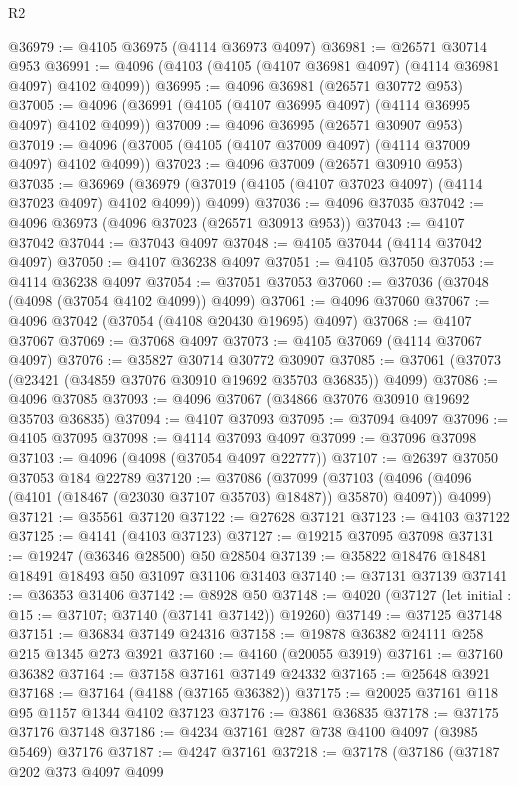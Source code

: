 \begin{lexlean}{R2}
\begin{coremodule}
@36979 := @4105 @36975 (@4114 @36973 @4097)
@36981 := @26571 @30714 @953
@36991 := @4096 (@4103 (@4105 (@4107 @36981 @4097) (@4114 @36981 @4097) @4102 @4099))
@36995 := @4096 @36981 (@26571 @30772 @953)
@37005 := @4096 (@36991 (@4105 (@4107 @36995 @4097) (@4114 @36995 @4097) @4102 @4099))
@37009 := @4096 @36995 (@26571 @30907 @953)
@37019 := @4096 (@37005 (@4105 (@4107 @37009 @4097) (@4114 @37009 @4097) @4102 @4099))
@37023 := @4096 @37009 (@26571 @30910 @953)
@37035 := @36969
    (@36979 (@37019 (@4105 (@4107 @37023 @4097) (@4114 @37023 @4097) @4102 @4099)) @4099)
@37036 := @4096 @37035
@37042 := @4096 @36973 (@4096 @37023 (@26571 @30913 @953))
@37043 := @4107 @37042
@37044 := @37043 @4097
@37048 := @4105 @37044 (@4114 @37042 @4097)
@37050 := @4107 @36238 @4097
@37051 := @4105 @37050
@37053 := @4114 @36238 @4097
@37054 := @37051 @37053
@37060 := @37036 (@37048 (@4098 (@37054 @4102 @4099)) @4099)
@37061 := @4096 @37060
@37067 := @4096 @37042 (@37054 (@4108 @20430 @19695) @4097)
@37068 := @4107 @37067
@37069 := @37068 @4097
@37073 := @4105 @37069 (@4114 @37067 @4097)
@37076 := @35827 @30714 @30772 @30907
@37085 := @37061 (@37073 (@23421 (@34859 @37076 @30910 @19692 @35703 @36835)) @4099)
@37086 := @4096 @37085
@37093 := @4096 @37067 (@34866 @37076 @30910 @19692 @35703 @36835)
@37094 := @4107 @37093
@37095 := @37094 @4097
@37096 := @4105 @37095
@37098 := @4114 @37093 @4097
@37099 := @37096 @37098
@37103 := @4096 (@4098 (@37054 @4097 @22777))
@37107 := @26397 @37050 @37053 @184 @22789
@37120 := @37086
    (@37099
      (@37103 (@4096 (@4096 (@4101 (@18467 (@23030 @37107 @35703) @18487)) @35870) @4097))
      @4099)
@37121 := @35561 @37120
@37122 := @27628 @37121
@37123 := @4103 @37122
@37125 := @4141 (@4103 @37123)
@37127 := @19215 @37095 @37098
@37131 := @19247 (@36346 @28500) @50 @28504
@37139 := @35822 @18476 @18481 @18491 @18493 @50 @31097 @31106 @31403
@37140 := @37131 @37139
@37141 := @36353 @31406
@37142 := @8928 @50
@37148 := @4020 (@37127 (let initial : @15 := @37107; @37140 (@37141 @37142)) @19260)
@37149 := @37125 @37148
@37151 := @36834 @37149 @24316
@37158 := @19878 @36382 @24111 @258 @215 @1345 @273 @3921
@37160 := @4160 (@20055 @3919)
@37161 := @37160 @36382
@37164 := @37158 @37161 @37149 @24332
@37165 := @25648 @3921
@37168 := @37164 (@4188 (@37165 @36382))
@37175 := @20025 @37161 @118 @95 @1157 @1344 @4102 @37123
@37176 := @3861 @36835
@37178 := @37175 @37176 @37148
@37186 := @4234 @37161 @287 @738 @4100 @4097 (@3985 @5469) @37176
@37187 := @4247 @37161
@37218 := @37178
    (@37186
      (@37187
        @202
        @373
        @4097
        @4099

\end{coremodule}
\end{lexlean}
